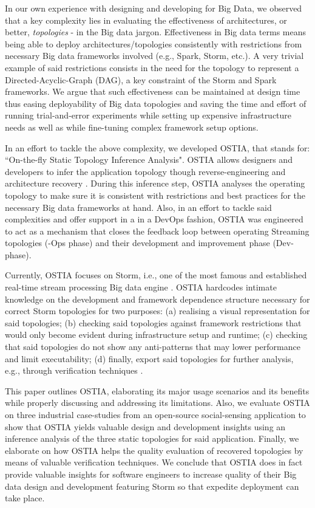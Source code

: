 In our own experience with designing and developing for Big Data, we observed that a key complexity lies in evaluating the effectiveness of architectures, or better, \emph{topologies} - in the Big data jargon. Effectiveness in Big data terms means being able to deploy architectures/topologies consistently with restrictions from necessary Big data frameworks involved (e.g., Spark, Storm, etc.). A very trivial example of said restrictions consists in the need for the topology to represent a Directed-Acyclic-Graph (DAG), a key constraint of the Storm and Spark frameworks.
We argue that such effectiveness can be maintained at design time thus easing deployability of Big data topologies and saving the time and effort of running trial-and-error experiments while setting up expensive infrastructure needs as well as while fine-tuning complex framework setup options.

In an effort to tackle the above complexity, we developed OSTIA, that stands for: ``On-the-fly Static Topology Inference Analysis". OSTIA allows designers and developers to infer the application topology though reverse-engineering and architecture recovery \cite{archrec}. During this inference step, OSTIA analyses the operating topology to make sure it is consistent with restrictions and best practices for the necessary Big data frameworks at hand. Also, in an effort to tackle said complexities and offer support in a  in a DevOps fashion, OSTIA was engineered to act as a mechanism that closes the feedback loop between operating Streaming topologies (-Ops phase) and their development and improvement phase (Dev- phase).

Currently, OSTIA focuses on Storm, i.e., one of the most famous and established real-time stream processing Big data engine \cite{storm}. OSTIA hardcodes intimate knowledge on the development and framework dependence structure necessary for correct Storm topologies for two purposes: (a) realising a visual representation for said topologies; (b) checking said topologies against framework restrictions that would only become evident during infrastructure setup and runtime; (c) checking that said topologies do not show any anti-patterns \cite{patternoriented2000} that may lower performance and limit executability; (d) finally, export said topologies for further analysis, e.g., through verification techniques \cite{icsoft}.

This paper outlines OSTIA, elaborating its major usage scenarios and its benefits while properly discussing and addressing its limitations. Also, we evaluate OSTIA on three industrial case-studies from an open-source social-sensing application to show that OSTIA yields valuable design and development insights using an inference analysis of the three static topologies for said application. Finally, we elaborate on how OSTIA helps the quality evaluation of recovered topologies by means of valuable verification techniques. We conclude that OSTIA does in fact provide valuable insights for software engineers to increase quality of their Big data design and development featuring Storm so that expedite deployment can take place.

